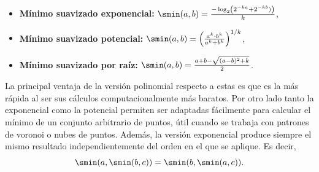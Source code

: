 \begin{itemize}
    \item \textbf{Mínimo suavizado exponencial:} $\smin(a,b) = \frac{-\log_2\left( 2^{-ka} + 2^{-kb} ) \right)}{k}$,
    \item \textbf{Mínimo suavizado potencial:} $\smin(a,b) = \left(\frac{a^k \cdot b^k}{a^k + b^k}\right)^{1/k}$,
    \item \textbf{Mínimo suavizado por raíz:} $\smin(a,b)= \frac{a +b - \sqrt{(a-b)^2+k}}{2}$.
\end{itemize}

La principal ventaja de la versión polinomial respecto a estas es que es la más rápida al ser sus cálculos computacionalmente más baratos. Por otro lado tanto la exponencial como la potencial permiten ser adaptadas fácilmente para calcular el mínimo de un conjunto arbitrario de puntos, útil cuando se trabaja con patrones de voronoi o nubes de puntos. Además, la versión exponencial produce siempre el mismo resultado independientemente del orden en el que se aplique. Es decir,
\begin{equation*}
    \smin(a,\smin(b,c)) = \smin(b,\smin(a,c)).
\end{equation*}

